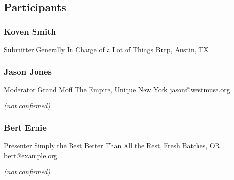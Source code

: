 \documentclass{report}
\begin{document}
            \subsection*{Participants}
              \subsubsection*{ Koven Smith }
              Submitter\newline
              Generally In Charge of a Lot of Things\newline
              Burp, Austin, TX
              \newline
              
              
              

              


              
                \subsubsection*{ Jason Jones }
                Moderator\newline
                Grand Moff\newline
                The Empire, Unique New York
                \newline
                jason@westmuse.org\newline
                
                

                
                \emph{ (not confirmed) }
              

              
                \subsubsection*{ Bert Ernie }
                Presenter\newline
                Simply the Best\newline
                Better Than All the Rest, Fresh Batches, OR
                \newline
                bert@example.org\newline
                
                

                
                \emph{ (not confirmed) }
              

              

              

              
\end{document}
